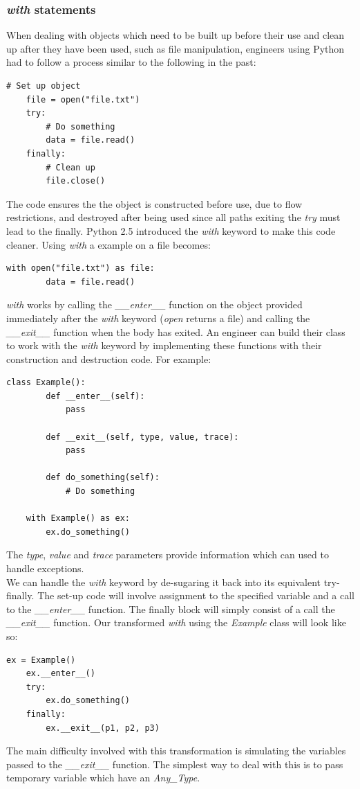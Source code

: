 \documentclass[12pt, titlepage]{article}
\begin{document}
\subsubsection{\textit{with} statements}
When dealing with objects which need to be built up before their use and clean up after they have been used, such as file manipulation, engineers using Python had to follow a process similar to the following in the past:
\begin{lstlisting}[mathescape]
	# Set up object
	file = open("file.txt")
	try:
		# Do something
		data = file.read()
	finally:
		# Clean up
		file.close()
\end{lstlisting}
The code ensures the the object is constructed before use, due to flow restrictions, and destroyed after being used since all paths exiting the \textit{try} must lead to the finally. Python 2.5 introduced the \textit{with} keyword to make this code cleaner. Using \textit{with} a example on a file becomes:
\begin{lstlisting}[mathescape]
	with open("file.txt") as file:
		data = file.read()
\end{lstlisting}
\textit{with} works by calling the \textit{\_\_enter\_\_} function on the object provided immediately after the \textit{with} keyword (\textit{open} returns a file) and calling the \textit{\_\_exit\_\_} function when the body has exited. An engineer can build their class to work with the \textit{with} keyword by implementing these functions with their construction and destruction code. For example:
\begin{lstlisting}[mathescape]
	class Example():
		def __enter__(self):
			pass
			
		def __exit__(self, type, value, trace):
			pass
			
		def do_something(self):
			# Do something
			
	with Example() as ex:
		ex.do_something()
\end{lstlisting}
The \textit{type}, \textit{value} and \textit{trace} parameters provide information which can used to handle exceptions. \\
We can handle the \textit{with} keyword by de-sugaring it back into its equivalent try-finally. The set-up code will involve assignment to the specified variable and a call to the \textit{\_\_enter\_\_} function. The finally block will simply consist of a call the \textit{\_\_exit\_\_} function. Our transformed \textit{with} using the \textit{Example} class will look like so:
\begin{lstlisting}[mathescape]
	ex = Example()
	ex.__enter__()
	try:
		ex.do_something()
	finally:
		ex.__exit__(p1, p2, p3)
\end{lstlisting}
The main difficulty involved with this transformation is simulating the variables passed to the \textit{\_\_exit\_\_} function. The simplest way to deal with this is to pass temporary variable which have an \textit{Any\_Type}.
\end{document}
